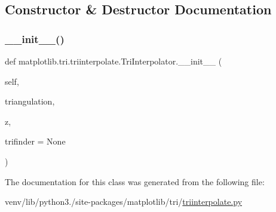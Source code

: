 \subsection{Constructor \& Destructor Documentation}
\mbox{\label{classmatplotlib_1_1tri_1_1triinterpolate_1_1TriInterpolator_a1897efb1464e95c3b19a316c742cde5e}} 
\subsubsection{\texorpdfstring{\+\_\+\+\_\+init\+\_\+\+\_\+()}{\_\_init\_\_()}}
{\footnotesize\ttfamily def matplotlib.\+tri.\+triinterpolate.\+Tri\+Interpolator.\+\_\+\+\_\+init\+\_\+\+\_\+ (\begin{DoxyParamCaption}\item[{}]{self,  }\item[{}]{triangulation,  }\item[{}]{z,  }\item[{}]{trifinder = {\ttfamily None} }\end{DoxyParamCaption})}



The documentation for this class was generated from the following file\+:\begin{DoxyCompactItemize}
\item 
venv/lib/python3./site-\/packages/matplotlib/tri/\hyperlink{triinterpolate_8py}{triinterpolate.\+py}\end{DoxyCompactItemize}
